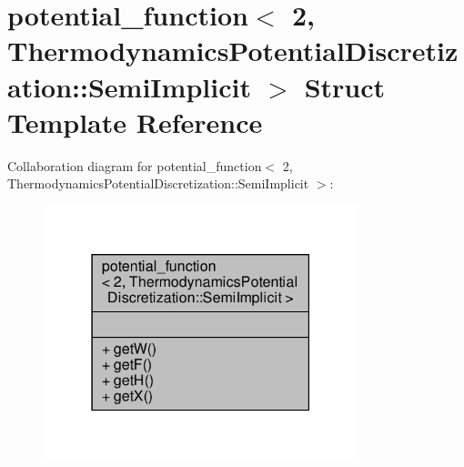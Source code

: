 \hypertarget{structpotential__function_3_012_00_01ThermodynamicsPotentialDiscretization_1_1SemiImplicit_01_4}{}\section{potential\+\_\+function$<$ 2, Thermodynamics\+Potential\+Discretization\+:\+:Semi\+Implicit $>$ Struct Template Reference}
\label{structpotential__function_3_012_00_01ThermodynamicsPotentialDiscretization_1_1SemiImplicit_01_4}


Collaboration diagram for potential\+\_\+function$<$ 2, Thermodynamics\+Potential\+Discretization\+:\+:Semi\+Implicit $>$\+:\nopagebreak
\begin{figure}[H]
\begin{center}
\leavevmode
\includegraphics[width=259pt]{structpotential__function_3_012_00_01ThermodynamicsPotentialDiscretization_1_1SemiImplicit_01_4__coll__graph}
\end{center}
\end{figure}
